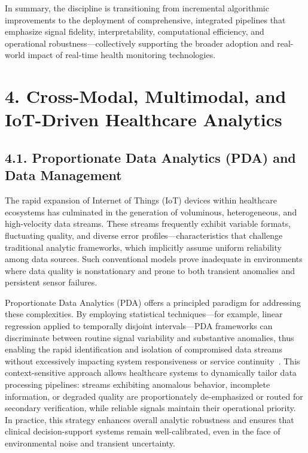 \documentclass[11pt]{article}
\begin{document}
In summary, the discipline is transitioning from incremental algorithmic improvements to the deployment of comprehensive, integrated pipelines that emphasize signal fidelity, interpretability, computational efficiency, and operational robustness—collectively supporting the broader adoption and real-world impact of real-time health monitoring technologies.

\section{4. Cross-Modal, Multimodal, and IoT-Driven Healthcare Analytics}

\subsection{4.1. Proportionate Data Analytics (PDA) and Data Management}

The rapid expansion of Internet of Things (IoT) devices within healthcare ecosystems has culminated in the generation of voluminous, heterogeneous, and high-velocity data streams. These streams frequently exhibit variable formats, fluctuating quality, and diverse error profiles—characteristics that challenge traditional analytic frameworks, which implicitly assume uniform reliability among data sources. Such conventional models prove inadequate in environments where data quality is nonstationary and prone to both transient anomalies and persistent sensor failures. 

Proportionate Data Analytics (PDA) offers a principled paradigm for addressing these complexities. By employing statistical techniques—for example, linear regression applied to temporally disjoint intervals—PDA frameworks can discriminate between routine signal variability and substantive anomalies, thus enabling the rapid identification and isolation of compromised data streams without excessively impacting system responsiveness or service continuity~\cite{ref106}. This context-sensitive approach allows healthcare systems to dynamically tailor data processing pipelines: streams exhibiting anomalous behavior, incomplete information, or degraded quality are proportionately de-emphasized or routed for secondary verification, while reliable signals maintain their operational priority. In practice, this strategy enhances overall analytic robustness and ensures that clinical decision-support systems remain well-calibrated, even in the face of environmental noise and transient uncertainty.
\end{document}
